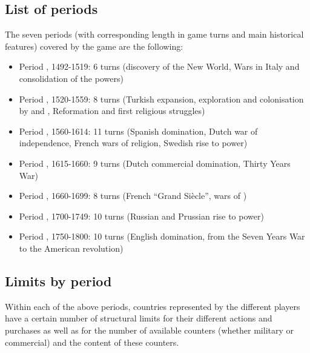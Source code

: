 \subsection{List of periods}

The seven periods (with corresponding length in game turns and main historical
features) covered by the game are the following:
\begin{itemize}
\item Period , 1492-1519: 6 turns (discovery of the New World, Wars
  in Italy and consolidation of the powers)%
\item Period , 1520-1559: 8 turns (Turkish expansion, exploration
  and colonisation by \SPA and \POR, Reformation and first religious
  struggles) %
\item Period , 1560-1614: 11 turns (Spanish domination, Dutch war
  of independence, French wars of religion, Swedish rise to
  power) %
\item Period , 1615-1660: 9 turns (Dutch commercial domination,
  Thirty Years War)%
\item Period , 1660-1699: 8 turns (French ``Grand Si\`{e}cle'', wars
  of )%
\item Period , 1700-1749: 10 turns (Russian and Prussian rise to
  power)%
\item Period , 1750-1800: 10 turns (English domination, from the
  Seven Years War to the American revolution)%
\end{itemize}



\subsection{Limits by period}

\label{chThePowers:Limits}
\aparag Within each of the above periods, countries represented by the
different players have a certain number of structural limits for their
different actions and purchases as well as for the number of available
counters (whether military or commercial) and the content of these counters.

